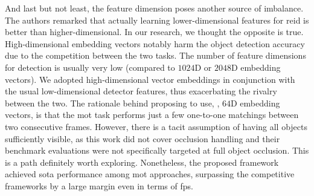 And last but not least, the feature dimension poses another source of imbalance. The authors remarked that actually learning lower-dimensional features for \gls{reid} is better than higher-dimensional. In our research, we thought the opposite is true. High-dimensional embedding vectors notably harm the object detection accuracy due to the competition between the two tasks. The number of feature dimensions for detection is usually very low (compared to $1024$D or $2048$D embedding vectors). We adopted high-dimensional vector embeddings in conjunction with the usual low-dimensional detector features, thus exacerbating the rivalry between the two. The rationale behind proposing to use, \egtext{}, $64$D embedding vectors, is that the \gls{mot} task performs just a few one-to-one matchings between two consecutive frames. However, there is a tacit assumption of having all objects sufficiently visible, as this work did not cover occlusion handling and their benchmark evaluations were not specifically targeted at full object occlusion. This is a path definitely worth exploring. Nonetheless, the proposed framework achieved \gls{sota} performance among \gls{mot} approaches, surpassing the competitive frameworks by a large margin even in terms of \gls{fps}.
